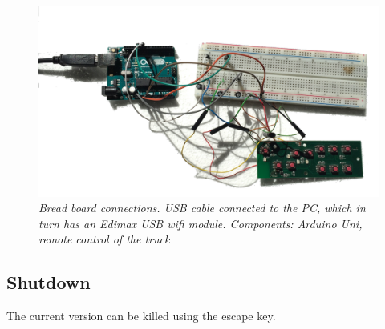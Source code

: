 \documentclass[11pt,a4paper]{book}
\begin{document}
\begin{figure}[!ht]

  \centering
    \includegraphics[width=\textwidth]{breadboard.png}
  \caption{\textit{Bread board connections. USB cable connected to the PC, which in turn has an Edimax USB wifi module. Components: Arduino Uni, remote control of the truck}}
\end{figure}

\subsection{Shutdown}
The current version can be killed using the escape key.
\end{document}
